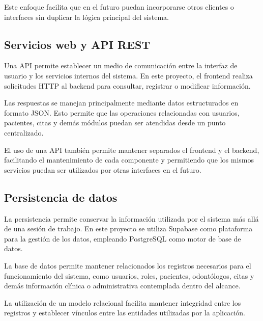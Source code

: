 Este enfoque facilita que en el futuro puedan incorporarse otros clientes
o interfaces sin duplicar la lógica principal del sistema.



\subsection{Servicios web y API REST}

Una API permite establecer un medio de comunicación entre la interfaz de
usuario y los servicios internos del sistema. En este proyecto, el frontend
realiza solicitudes HTTP al backend para consultar, registrar o modificar
información.

Las respuestas se manejan principalmente mediante datos estructurados en
formato JSON. Esto permite que las operaciones relacionadas con usuarios,
pacientes, citas y demás módulos puedan ser atendidas desde un punto
centralizado.

El uso de una API también permite mantener separados el frontend y el
backend, facilitando el mantenimiento de cada componente y permitiendo que
los mismos servicios puedan ser utilizados por otras interfaces en el
futuro.



\subsection{Persistencia de datos}

La persistencia permite conservar la información utilizada por el sistema
más allá de una sesión de trabajo. En este proyecto se utiliza Supabase
como plataforma para la gestión de los datos, empleando PostgreSQL como
motor de base de datos.

La base de datos permite mantener relacionados los registros necesarios
para el funcionamiento del sistema, como usuarios, roles, pacientes,
odontólogos, citas y demás información clínica o administrativa contemplada
dentro del alcance.

La utilización de un modelo relacional facilita mantener integridad entre
los registros y establecer vínculos entre las entidades utilizadas por la
aplicación.



